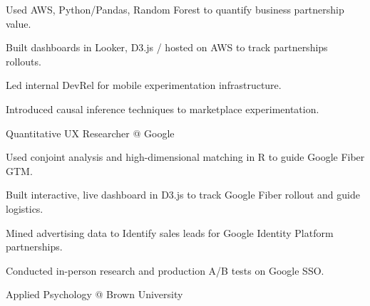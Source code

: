 \documentclass[12pt]{res}
\begin{document}
{\begin{resume}
\begin{list}{}{\leftmargin=1em}
\begin{list}{-}{\leftmargin=1em}
\item Used AWS, Python/Pandas, Random Forest to quantify business partnership value.
\item Built dashboards in Looker, D3.js / hosted on AWS to track partnerships rollouts.
\item Led internal DevRel for mobile experimentation infrastructure.
\item Introduced causal inference techniques to marketplace experimentation.
\end{list}
\item \raggedright{Quantitative UX Researcher @ Google\dotfill}
\begin{list}{-}{\leftmargin=1em}
\item Used conjoint analysis and high-dimensional matching in R to guide Google Fiber GTM.
\item Built interactive, live dashboard in D3.js to track Google Fiber rollout and guide logistics.
\item Mined advertising data to Identify sales leads for Google Identity Platform partnerships.
\item Conducted in-person research and production A/B tests on Google SSO.
\end{list}
\item {}
\item \raggedright{Applied Psychology @ Brown University}\dotfill {}
\item
\end{list}
\end{resume}
} %
\end{document}
